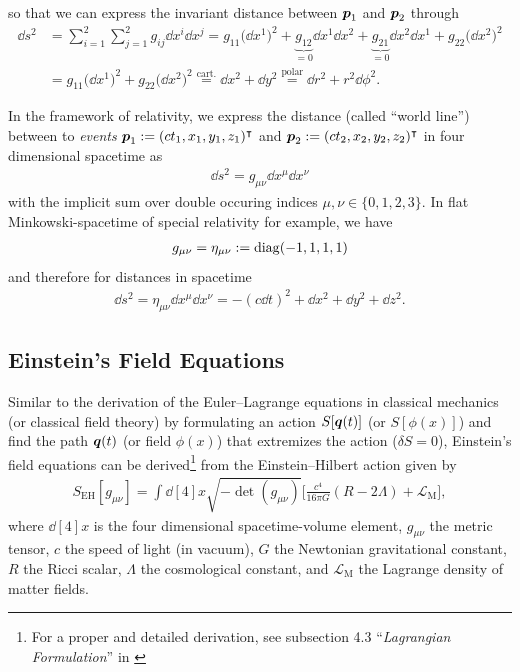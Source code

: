 so that we can express the invariant distance between $\vb*{p}_{1}$ and $\vb*{p}_{2}$ through
\begin{align}
    \dd{s}^2 &= \sum_{i = 1}^{2} \sum_{j = 1}^{2} g_{ij}\dd{x}^{i}\dd{x}^{j} = g_{11} \bigl(\dd{x}^{1}\bigr)^2 + \underbrace{g_{12}}_{= 0} \dd{x}^{1}\dd{x}^{2} + \underbrace{g_{21}}_{= 0} \dd{x}^{2} \dd{x}^{1} + g_{22} \bigl(\dd{x}^{2} \bigr)^2 \\
             &= g_{11} \bigl(\dd{x}^{1}\bigr)^2 + g_{22} \bigl(\dd{x}^{2}\bigr)^2 \overset{\text{cart.}}{=} \dd{x}^{2} + \dd{y}^{2} \overset{\text{polar}}{=} \dd{r}^{2} + r^2 \dd{\phi}^{2}.  
\end{align}

\noindent In the framework of relativity, we express the distance (called ``world line'') between to \textit{events} $\vb*{p}_{1} := (c t_{1}, x_{1}, y_{1}, z_{1})^{\intercal}$ and $\vb*{p}_{2} := (c t_{2}, x_{2}, y_{2}, z_{2})^{\intercal}$ in four dimensional spacetime as
\begin{align}
    \dd{s}^2 = g_{\mu\nu} \dd{x}^{\mu} \dd{x}^{\nu}
\end{align}
with the implicit sum over double occuring indices $\mu, \nu \in \{0,1,2,3\}$. In flat Minkowski-spacetime of special relativity for example, we have 
\begin{align}
    g_{\mu\nu} = \eta_{\mu\nu} := \operatorname{diag}(-1, 1, 1, 1) 
\end{align} 
and therefore for distances in spacetime
\begin{align}
    \dd{s}^2 = \eta_{\mu\nu} \dd{x}^{\mu} \dd{x}^{\nu} = - (c \dd{t})^{2} + \dd{x}^{2} + \dd{y}^{2} + \dd{z}^{2}.    
\end{align}



\subsection{Einstein's Field Equations}

\noindent Similar to the derivation of the Euler--Lagrange equations in classical mechanics (or classical field theory) by formulating an action $S[\vb*{q}(t)]$ (or $S[\phi(x)]$) and find the path $\vb*{q}(t)$ (or field $\phi(x)$) that extremizes the action ($\delta S = 0$), Einstein's field equations can be derived\footnote{For a proper and detailed derivation, see subsection 4.3 ``\textit{Lagrangian Formulation}'' in \cite[p.~159]{SeanCarroll2019}} from the Einstein--Hilbert action given by
\begin{align}
    S_{\text{EH}}[g_{\mu\nu}] = \int \dd[4]{x} \sqrt{-\det(g_{\mu\nu})} \biggl[\frac{c^4}{16\pi G}(R - 2\Lambda) + \mathcal{L}_{\text{M}} \biggr], 
\end{align}
where $\dd[4]{x}$ is the four dimensional spacetime-volume element, $g_{\mu\nu}$ the metric tensor, $c$ the speed of light (in vacuum), $G$ the Newtonian gravitational constant, $R$ the Ricci scalar, $\Lambda$ the cosmological constant, and $\mathcal{L}_{\text{M}}$ the Lagrange density of matter fields. 

